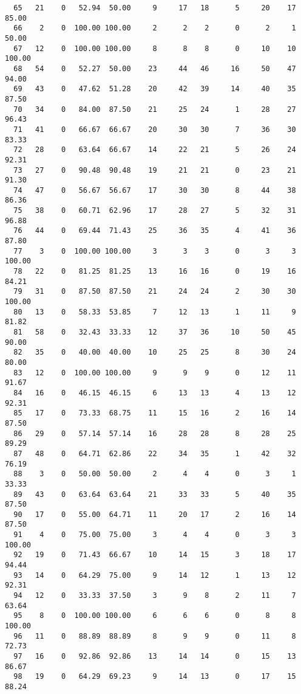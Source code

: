 \begin{verbatim}
  65   21    0   52.94  50.00     9     17   18      5     20    17    85.00
  66    2    0  100.00 100.00     2      2    2      0      2     1    50.00
  67   12    0  100.00 100.00     8      8    8      0     10    10   100.00
  68   54    0   52.27  50.00    23     44   46     16     50    47    94.00
  69   43    0   47.62  51.28    20     42   39     14     40    35    87.50
  70   34    0   84.00  87.50    21     25   24      1     28    27    96.43
  71   41    0   66.67  66.67    20     30   30      7     36    30    83.33
  72   28    0   63.64  66.67    14     22   21      5     26    24    92.31
  73   27    0   90.48  90.48    19     21   21      0     23    21    91.30
  74   47    0   56.67  56.67    17     30   30      8     44    38    86.36
  75   38    0   60.71  62.96    17     28   27      5     32    31    96.88
  76   44    0   69.44  71.43    25     36   35      4     41    36    87.80
  77    3    0  100.00 100.00     3      3    3      0      3     3   100.00
  78   22    0   81.25  81.25    13     16   16      0     19    16    84.21
  79   31    0   87.50  87.50    21     24   24      2     30    30   100.00
  80   13    0   58.33  53.85     7     12   13      1     11     9    81.82
  81   58    0   32.43  33.33    12     37   36     10     50    45    90.00
  82   35    0   40.00  40.00    10     25   25      8     30    24    80.00
  83   12    0  100.00 100.00     9      9    9      0     12    11    91.67
  84   16    0   46.15  46.15     6     13   13      4     13    12    92.31
  85   17    0   73.33  68.75    11     15   16      2     16    14    87.50
  86   29    0   57.14  57.14    16     28   28      8     28    25    89.29
  87   48    0   64.71  62.86    22     34   35      1     42    32    76.19
  88    3    0   50.00  50.00     2      4    4      0      3     1    33.33
  89   43    0   63.64  63.64    21     33   33      5     40    35    87.50
  90   17    0   55.00  64.71    11     20   17      2     16    14    87.50
  91    4    0   75.00  75.00     3      4    4      0      3     3   100.00
  92   19    0   71.43  66.67    10     14   15      3     18    17    94.44
  93   14    0   64.29  75.00     9     14   12      1     13    12    92.31
  94   12    0   33.33  37.50     3      9    8      2     11     7    63.64
  95    8    0  100.00 100.00     6      6    6      0      8     8   100.00
  96   11    0   88.89  88.89     8      9    9      0     11     8    72.73
  97   16    0   92.86  92.86    13     14   14      0     15    13    86.67
  98   19    0   64.29  69.23     9     14   13      0     17    15    88.24

\end{verbatim}
